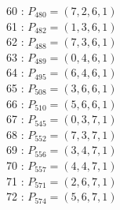 \documentclass{article}
\begin{document}
{\begin{multicols}{3}
60 : $P_{480}=( 7, 2, 6, 1 )$\\
61 : $P_{482}=( 1, 3, 6, 1 )$\\
62 : $P_{488}=( 7, 3, 6, 1 )$\\
63 : $P_{489}=( 0, 4, 6, 1 )$\\
64 : $P_{495}=( 6, 4, 6, 1 )$\\
65 : $P_{508}=( 3, 6, 6, 1 )$\\
66 : $P_{510}=( 5, 6, 6, 1 )$\\
67 : $P_{545}=( 0, 3, 7, 1 )$\\
68 : $P_{552}=( 7, 3, 7, 1 )$\\
69 : $P_{556}=( 3, 4, 7, 1 )$\\
70 : $P_{557}=( 4, 4, 7, 1 )$\\
71 : $P_{571}=( 2, 6, 7, 1 )$\\
72 : $P_{574}=( 5, 6, 7, 1 )$\\
\end{multicols}


%


%


}%
\end{document}
